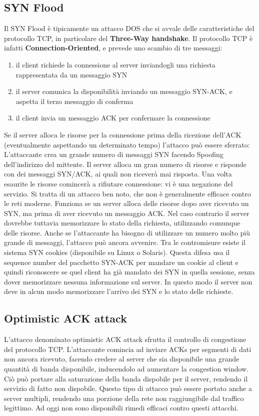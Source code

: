 \subsection{SYN Flood}
Il SYN Flood è tipicamente un attacco DOS che si avvale delle caratteristiche del protocollo TCP, in particolare del \textbf{Three-Way handshake}. Il protocollo TCP è infatti \textbf{Connection-Oriented}, e prevede uno scambio di tre messaggi:
\begin{enumerate}
\item il client richiede la connessione al server inviandogli una richiesta rappresentata da un messaggio SYN
\item il server comunica la disponibilità inviando un messaggio SYN-ACK, e aspetta il terzo messaggio di conferma
\item il client invia un messaggio ACK per confermare la connessione
\end{enumerate}
Se il server alloca le risorse per la connessione prima della ricezione dell'ACK (eventualmente aspettando un determinato tempo) l'attacco può essere sferrato: L'attaccante crea un grande numero di messaggi SYN facendo Spoofing dell'indirizzo del mittente. Il server alloca un gran numero di risorse e risponde con dei messaggi SYN/ACK, ai quali non riceverà mai risposta. Una volta esaurite le risorse comincerà a rifiutare connessione: vi è una negazione del servizio. Si tratta di un attacco ben noto, che non è generalmente efficace contro le reti moderne. Funziona se un server alloca delle risorse dopo aver ricevuto un SYN, ma prima di aver ricevuto un messaggio ACK. Nel caso contrario il server dovrebbe tuttavia memorizzare lo stato della richiesta, utilizzando comunque delle risorse. Anche se l'attaccante ha bisogno di utilizzare un numero molto più grande di messaggi, l'attacco può ancora avvenire. Tra le contromisure esiste il sistema SYN cookies (disponibile su Linux o Solaris). Questa difesa usa il sequence number del pacchetto SYN-ACK per mandare un cookie al client e quindi riconoscere se quel client ha già mandato dei SYN in quella sessione, senza dover memorizzare nessuna informazione sul server. In questo modo il server non deve in alcun modo memorizzare l'arrivo dei SYN e lo stato delle richieste.

\subsection{Optimistic ACK attack}
L'attacco denominato optimistic ACK attack sfrutta il controllo di congestione del protocollo TCP. L'attaccante comincia ad inviare ACKs per segmenti di dati non ancora ricevuto, facendo credere al server che sia disponibile una grande quantità di banda disponibile, inducendolo ad aumentare la congestion window. Ciò può portare alla saturazione della banda dispobile per il server, rendendo il servizio di fatto non dispobile. Questo tipo di attacco può essere portato anche a server multipli, rendendo una porzione della rete non raggiungibile dal traffico legittimo. Ad oggi non sono disponibili rimedi efficaci contro questi attacchi.
